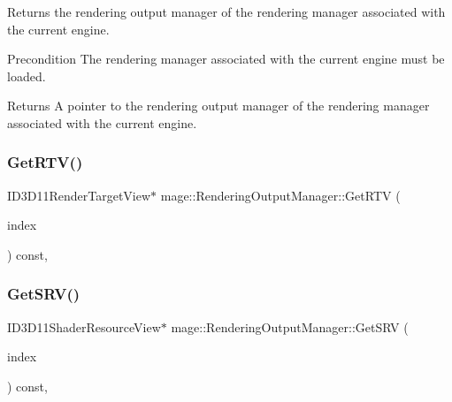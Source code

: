 Returns the rendering output manager of the rendering manager associated with the current engine.

\begin{DoxyPrecond}{Precondition}
The rendering manager associated with the current engine must be loaded. 
\end{DoxyPrecond}
\begin{DoxyReturn}{Returns}
A pointer to the rendering output manager of the rendering manager associated with the current engine. 
\end{DoxyReturn}
\hypertarget{classmage_1_1_rendering_output_manager_a367665fe249f8dd373ae48f4f6c731bd}{}\label{classmage_1_1_rendering_output_manager_a367665fe249f8dd373ae48f4f6c731bd} 
\subsubsection{\texorpdfstring{Get\+R\+T\+V()}{GetRTV()}}
{\footnotesize\ttfamily I\+D3\+D11\+Render\+Target\+View$\ast$ mage\+::\+Rendering\+Output\+Manager\+::\+Get\+R\+TV (\begin{DoxyParamCaption}\item[{\hyperlink{classmage_1_1_rendering_output_manager_aebe136819797593f0fcf53b753e9c3ce}{R\+T\+V\+Index}}]{index }\end{DoxyParamCaption}) const\hspace{0.3cm}{\ttfamily [private]}, {\ttfamily [noexcept]}}

\hypertarget{classmage_1_1_rendering_output_manager_adbccd7240023dd803ce7764e6d4e3298}{}\label{classmage_1_1_rendering_output_manager_adbccd7240023dd803ce7764e6d4e3298} 
\subsubsection{\texorpdfstring{Get\+S\+R\+V()}{GetSRV()}}
{\footnotesize\ttfamily I\+D3\+D11\+Shader\+Resource\+View$\ast$ mage\+::\+Rendering\+Output\+Manager\+::\+Get\+S\+RV (\begin{DoxyParamCaption}\item[{\hyperlink{classmage_1_1_rendering_output_manager_a25aa12ba77bb160c5641cf54f7a68a29}{S\+R\+V\+Index}}]{index }\end{DoxyParamCaption}) const\hspace{0.3cm}{\ttfamily [private]}, {\ttfamily [noexcept]}}

